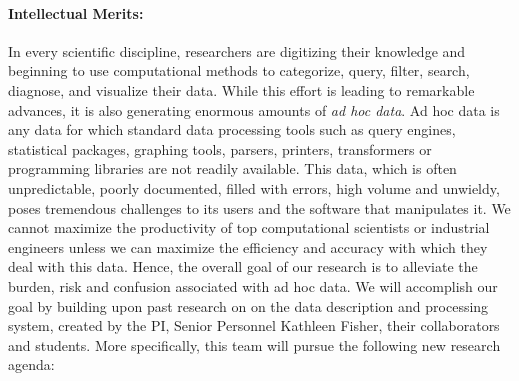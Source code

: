 
\paragraph*{Intellectual Merits:} 
In every scientific discipline, researchers are digitizing their knowledge and
beginning to use computational methods to categorize,
query, filter, search, diagnose, and visualize their data.  
While this effort is leading to remarkable advances,
it is also generating enormous amounts of {\em ad hoc data}.
Ad hoc data is any data for which standard data processing tools
such as query engines, statistical packages, graphing tools, parsers, printers,
transformers or programming libraries are not readily available.
This data, which is often unpredictable, poorly documented,
filled with errors, high volume and unwieldy,
poses tremendous challenges to its users and the software
that manipulates it.  We cannot maximize the productivity of top 
computational scientists or industrial engineers
unless we can maximize the efficiency and 
accuracy with which they deal with this data.  Hence, the overall goal of
our research is to alleviate the burden, risk and confusion
associated with ad hoc data.  
We will accomplish our goal by building upon past research
on on the \pads{} data description and processing system, created by the 
PI, Senior Personnel Kathleen Fisher, their collaborators and students. 
More specifically, this team will pursue the following
new research agenda:


